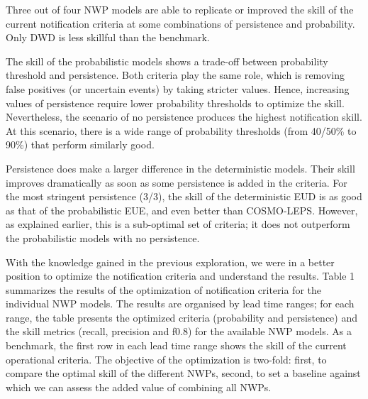 \documentclass[preprint,12pt]{elsarticle}
\begin{document}
Three out of four NWP models are able to replicate or improved the skill of the current notification criteria at some combinations of persistence and probability. Only DWD is less skillful than the benchmark.

The skill of the probabilistic models shows a trade-off between probability threshold and persistence. Both criteria play the same role, which is removing false positives (or uncertain events) by taking stricter values. Hence, increasing values of persistence require lower probability thresholds to optimize the skill. Nevertheless, the scenario of no persistence produces the highest notification skill. At this scenario, there is a wide range of probability thresholds (from 40/50\% to 90\%) that perform similarly good.

Persistence does make a larger difference in the deterministic models. Their skill improves dramatically as soon as some persistence is added in the criteria. For the most stringent persistence (3/3), the skill of the deterministic EUD is as good as that of the probabilistic EUE, and even better than COSMO-LEPS. However, as explained earlier, this is a sub-optimal set of criteria; it does not outperform the probabilistic models with no persistence.

With the knowledge gained in the previous exploration, we were in a better position to optimize the notification criteria and understand the results. Table 1 summarizes the results of the optimization of notification criteria for the individual NWP models. The results are organised by lead time ranges; for each range, the table presents the optimized criteria (probability and persistence) and the skill metrics (recall, precision and f0.8) for the available NWP models. As a benchmark, the first row in each lead time range shows the skill of the current operational criteria. The objective of the optimization is two-fold: first, to compare the optimal skill of the different NWPs, second, to set a baseline against which we can assess the added value of combining all NWPs.
\end{document}
